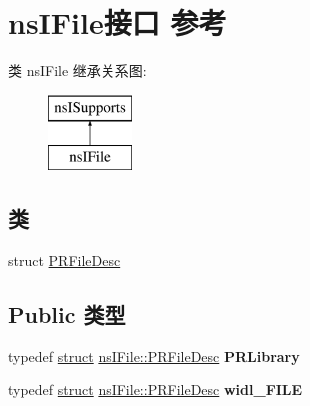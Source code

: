 \hypertarget{interfacens_i_file}{}\section{ns\+I\+File接口 参考}
\label{interfacens_i_file}
类 ns\+I\+File 继承关系图\+:\begin{figure}[H]
\begin{center}
\leavevmode
\includegraphics[height=2.000000cm]{interfacens_i_file}
\end{center}
\end{figure}
\subsection*{类}
\begin{DoxyCompactItemize}
\item 
struct \hyperlink{structns_i_file_1_1_p_r_file_desc}{P\+R\+File\+Desc}
\end{DoxyCompactItemize}
\subsection*{Public 类型}
\begin{DoxyCompactItemize}
\item 
\mbox{\label{interfacens_i_file_ac04c09471847e8546b41f835a28e21a7}} 
typedef \hyperlink{interfacestruct}{struct} \hyperlink{structns_i_file_1_1_p_r_file_desc}{ns\+I\+File\+::\+P\+R\+File\+Desc} {\bfseries P\+R\+Library}
\item 
\mbox{\label{interfacens_i_file_abb292cb4a233e145641fb2233be7b836}} 
typedef \hyperlink{interfacestruct}{struct} \hyperlink{structns_i_file_1_1_p_r_file_desc}{ns\+I\+File\+::\+P\+R\+File\+Desc} {\bfseries widl\+\_\+\+F\+I\+LE}
\end{DoxyCompactItemize}
